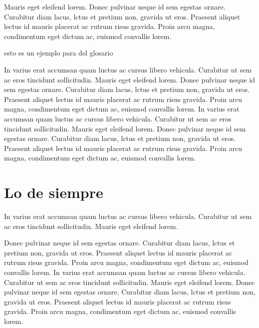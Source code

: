 
Mauris eget eleifend lorem. Donec pulvinar neque id sem egestas ornare. Curabitur diam lacus, lctus et pretium non, gravida ut eros. Praesent aliquet lectus id mauris placerat ac rutrum risus gravida. Proin arcu magna, condimentum eget dictum ac, euismod convallis lorem. 

esto es un ejemplo para  del glosario

In varius erat accumsan quam luctus ac cursus libero vehicula. Curabitur ut sem ac eros tincidunt sollicitudin. Mauris eget eleifend lorem. Donec pulvinar neque id sem egestas ornare. Curabitur diam lacus, lctus et pretium non, gravida ut eros. Praesent aliquet lectus id mauris placerat ac rutrum risus gravida. Proin arcu magna, condimentum eget dictum ac, euismod convallis lorem. In varius erat accumsan quam luctus ac cursus libero vehicula. Curabitur ut sem ac eros tincidunt sollicitudin. Mauris eget eleifend lorem. Donec pulvinar neque id sem egestas ornare. Curabitur diam lacus, lctus et pretium non, gravida ut eros. Praesent aliquet lectus id mauris placerat ac rutrum risus gravida. Proin arcu magna, condimentum eget dictum ac, euismod convallis lorem. 

\section{Lo de siempre}

In varius erat accumsan quam luctus ac cursus libero vehicula. Curabitur ut sem ac eros tincidunt sollicitudin. Mauris eget eleifend lorem. 

Donec pulvinar neque id sem egestas ornare. Curabitur diam lacus, lctus et pretium non, gravida ut eros. Praesent aliquet lectus id mauris placerat ac rutrum risus gravida. Proin arcu magna, condimentum eget dictum ac, euismod convallis lorem. In varius erat accumsan quam luctus ac cursus libero vehicula. Curabitur ut sem ac eros tincidunt sollicitudin. Mauris eget eleifend lorem. Donec pulvinar neque id sem egestas ornare. Curabitur diam lacus, lctus et pretium non, gravida ut eros. Praesent aliquet lectus id mauris placerat ac rutrum risus gravida. Proin arcu magna, condimentum eget dictum ac, euismod convallis lorem. 


